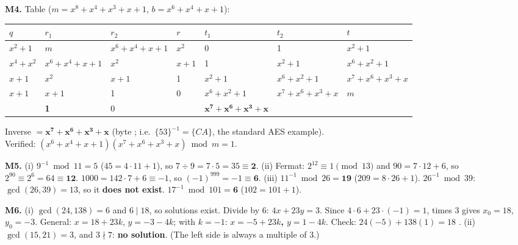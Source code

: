 \textbf{M4.} Table ($m = x^8{+}x^4{+}x^3{+}x{+}1$, $b = x^6{+}x^4{+}x{+}1$):
\begin{center}\small\setlength{\tabcolsep}{3pt}
\begin{tabular}{@{}lllllll@{}}
\toprule
$q$ & $r_1$ & $r_2$ & $r$ & $t_1$ & $t_2$ & $t$\\
\midrule
$x^2{+}1$ & $m$ & $x^6{+}x^4{+}x{+}1$ & $x^2$ & 0 & 1 & $x^2{+}1$\\
$x^4{+}x^2$ & $x^6{+}x^4{+}x{+}1$ & $x^2$ & $x{+}1$ & 1 & $x^2{+}1$ & $x^6{+}x^2{+}1$\\
$x{+}1$ & $x^2$ & $x{+}1$ & 1 & $x^2{+}1$ & $x^6{+}x^2{+}1$ & $x^7{+}x^6{+}x^3{+}x$\\
$x{+}1$ & $x{+}1$ & 1 & 0 & $x^6{+}x^2{+}1$ & $x^7{+}x^6{+}x^3{+}x$ & $m$\\
 & \textbf{1} & 0 & & $\mathbf{x^7{+}x^6{+}x^3{+}x}$ & & \\
\bottomrule
\end{tabular}
\end{center}
Inverse $= \mathbf{x^7 + x^6 + x^3 + x}$ (byte ; i.e.\ $\{53\}^{-1} = \{CA\}$, the standard AES example).\\
Verified: $(x^6{+}x^4{+}x{+}1)(x^7{+}x^6{+}x^3{+}x) \bmod m = 1$.

\textbf{M5.} (i) $9^{-1} \bmod 11 = 5$ ($45 = 4\cdot11 + 1$), so $7 \div 9 = 7 \cdot 5 = 35 \equiv \mathbf{2}$.
(ii) Fermat: $2^{12} \equiv 1 \pmod{13}$ and $90 = 7\cdot12 + 6$, so $2^{90} \equiv 2^6 = 64 \equiv \mathbf{12}$. \;$1000 = 142\cdot7 + 6 \equiv -1$, so $(-1)^{999} = -1 \equiv \mathbf{6}$.
(iii) $11^{-1} \bmod 26 = \mathbf{19}$ ($209 = 8\cdot26 + 1$). $26^{-1} \bmod 39$: $\gcd(26, 39) = 13$, so it \textbf{does not exist}. $17^{-1} \bmod 101 = \mathbf{6}$ ($102 = 101 + 1$).

\textbf{M6.} (i) $\gcd(24, 138) = 6$ and $6 \mid 18$, so solutions exist. Divide by 6: $4x + 23y = 3$. Since $4\cdot6 + 23\cdot(-1) = 1$, times 3 gives $x_0 = 18$, $y_0 = -3$.
General: $x = 18 + 23k$, $y = -3 - 4k$; with $k = -1$: \textbf{$x = -5 + 23k$, $y = 1 - 4k$}. Check: $24(-5) + 138(1) = 18$ \checkmark.
(ii) $\gcd(15, 21) = 3$, and $3 \nmid 7$: \textbf{no solution}. (The left side is always a multiple of 3.)

